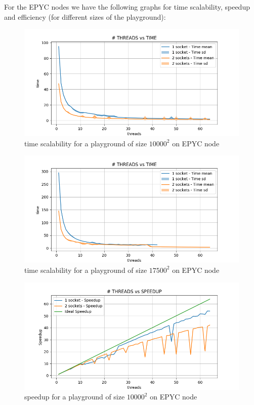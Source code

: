 \documentclass[12pt, titlepage]{report}
\begin{document}
For the EPYC nodes we have the following graphs for time scalability, speedup and efficiency (for different sizes of the playground):
\begin{figure}[H]
	\centering
	\includegraphics[width=\textwidth]{Assignment-1/OMP-static-10000-10-EPYC-1sockettime.png}
	\caption{time scalability for a playground of size $10000^2$ on EPYC node}
\end{figure}
\begin{figure}[H]
	\centering
	\includegraphics[width=\textwidth]{Assignment-1/OMP-static-17500-10-EPYC-1sockettime.png}
	\caption{time scalability for a playground of size $17500^2$ on EPYC node}
\end{figure}
\begin{figure}[H]
	\centering
	\includegraphics[width=\textwidth]{Assignment-1/OMP-static-10000-10-EPYC-1socketspeedUp.png}
	\caption{speedup for a playground of size $10000^2$ on EPYC node}
\end{figure}
\end{document}
